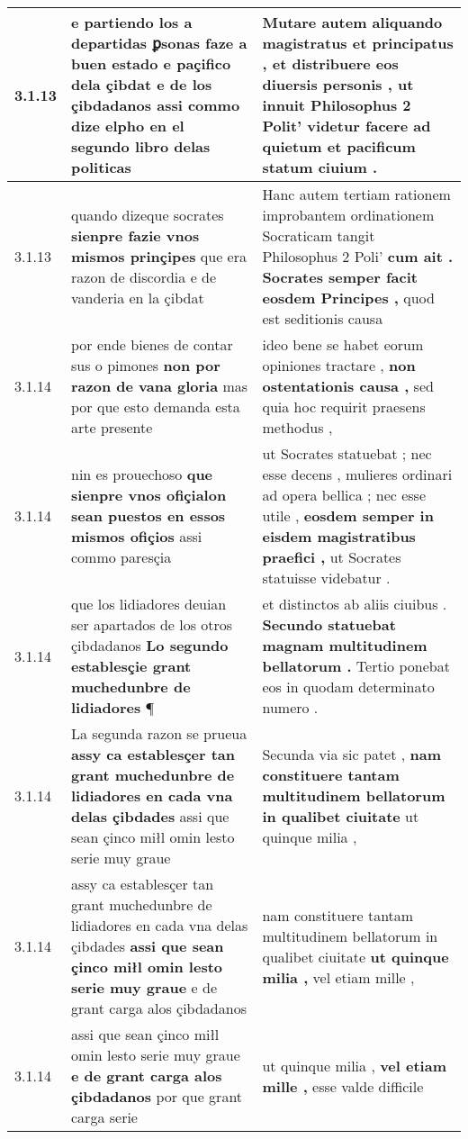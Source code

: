 \begin{tabular}{|p{1cm}|p{6.5cm}|p{6.5cm}|}
3.1.13 & e partiendo los a departidas \textbf{ ꝑsonas faze a buen estado e paçifico dela çibdat e de los çibdadanos } assi commo dize elpho en el segundo libro delas politicas & Mutare autem aliquando magistratus et principatus , et distribuere eos diuersis personis , \textbf{ ut innuit Philosophus 2 Polit’ videtur facere ad quietum } et pacificum statum ciuium . \\\hline
3.1.13 & quando dizeque socrates \textbf{ sienpre fazie vnos mismos prinçipes } que era razon de discordia e de vanderia en la çibdat & Hanc autem tertiam rationem improbantem ordinationem Socraticam tangit Philosophus 2 Poli’ \textbf{ cum ait . Socrates semper facit eosdem Principes , } quod est seditionis causa \\\hline
3.1.14 & por ende bienes de contar sus o pimones \textbf{ non por razon de vana gloria } mas por que esto demanda esta arte presente & ideo bene se habet eorum opiniones tractare , \textbf{ non ostentationis causa , } sed quia hoc requirit praesens methodus , \\\hline
3.1.14 & nin es prouechoso \textbf{ que sienpre vnos ofiçialon sean puestos en essos mismos ofiçios } assi commo paresçia & ut Socrates statuebat ; nec esse decens , mulieres ordinari ad opera bellica ; nec esse utile , \textbf{ eosdem semper in eisdem magistratibus praefici , } ut Socrates statuisse videbatur . \\\hline
3.1.14 & que los lidiadores deuian ser apartados de los otros çibdadanos \textbf{ Lo segundo establesçie grant muchedunbre de lidiadores } ¶ & et distinctos ab aliis ciuibus . \textbf{ Secundo statuebat magnam multitudinem bellatorum . } Tertio ponebat eos in quodam determinato numero . \\\hline
3.1.14 & La segunda razon se prueua \textbf{ assy ca establesçer tan grant muchedunbre de lidiadores en cada vna delas çibdades } assi que sean çinco miłl omin lesto serie muy graue & Secunda via sic patet , \textbf{ nam constituere tantam multitudinem bellatorum in qualibet ciuitate } ut quinque milia , \\\hline
3.1.14 & assy ca establesçer tan grant muchedunbre de lidiadores en cada vna delas çibdades \textbf{ assi que sean çinco miłl omin lesto serie muy graue } e de grant carga alos çibdadanos & nam constituere tantam multitudinem bellatorum in qualibet ciuitate \textbf{ ut quinque milia , } vel etiam mille , \\\hline
3.1.14 & assi que sean çinco miłl omin lesto serie muy graue \textbf{ e de grant carga alos çibdadanos } por que grant carga serie & ut quinque milia , \textbf{ vel etiam mille , } esse valde difficile \\\hline

\end{tabular}
